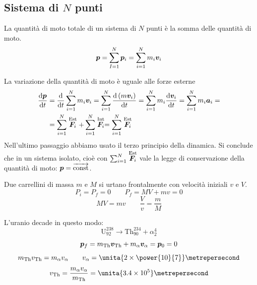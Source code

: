 \subsection{Sistema di $N$ punti}
\begin{Def}
La quantità di moto totale di un sistema di $N$ punti è la somma delle quantità di moto.
\begin{equation}
 \boldsymbol{p}=\sum_{I=1}^N\boldsymbol{p}_i=\sum_{i=1}^Nm_i\boldsymbol{v}_i
\end{equation}
\end{Def}
\begin{Teo}
 La variazione della quantità di moto è uguale alle forze esterne
\begin{align*}\frac{\mathrm{d} \boldsymbol{p}}{\mathrm{d} t}&=\frac{\mathrm{d} }{\mathrm{d} t}\sum^N_{i=1}m_i\boldsymbol{v}_i=\sum_{i=1}^{N}\frac{\mathrm{d} \left(m\boldsymbol{v}_i\right)}{\mathrm{d} t}=\sum_{i=1}^{N}m_i\frac{\mathrm{d} \boldsymbol{v}_i}{\mathrm{d} t}=\sum_{i=1}^{N}m_i\boldsymbol{a}_i=\\
&=\sum^N_{i=1}\stackrel{\text{Est}}{\boldsymbol{F}_i}+\sum^N_{i=1}\stackrel{\text{Int}}{\boldsymbol{F}_i}=\sum^N_{i=1}\stackrel{\text{Est}}{\boldsymbol{F}_i}\end{align*}
Nell'ultimo passaggio abbiamo usato il terzo principio della dinamica. Si conclude che in un sistema isolato, cioè con
$\sum^N_{i=1}\stackrel{\text{Est}}{\boldsymbol{F}_i}$ vale la legge di
conservazione della quantità di moto: $\boldsymbol{p}=\overrightarrow{\text{const}}$.
\end{Teo}
\begin{Es}[carrellini]
Due carrellini di massa $m$ e $M$ si urtano frontalmente con
velocità iniziali $v$ e $V$.
\begin{equation*} P_i= P_f=0\qquad P_f=M V+m v=0\end{equation*}
\begin{equation*}M V=m v\qquad\frac{V}{v}=\frac{m}{M}\end{equation*}
\end{Es}

\begin{Es}[decadimento]
L'uranio decade in questo modo:
\begin{equation*}\mathrm{U}^{238}_{92}\rightarrow \mathrm{Th}^{234}_{90}+\alpha^4_2\end{equation*}
\begin{equation*}\boldsymbol{p}_f=m_{\mathrm{Th}}\boldsymbol{v}_{\mathrm{Th}}+m_\alpha \boldsymbol{v}_\alpha=\boldsymbol{p}_0=0\end{equation*}
\begin{equation*}m_{\mathrm{Th}}v_{\mathrm{Th}}=m_\alpha v_\alpha\qquad v_\alpha=\unita{2\times \power{10}{7}}\metrepersecond\end{equation*}
\begin{equation*}v_{\mathrm{Th}}=\frac{m_\alpha v_\alpha}{m_{\mathrm{Th}}}=\unita{3.4\times
10^5}\metrepersecond\end{equation*}
\end{Es}


